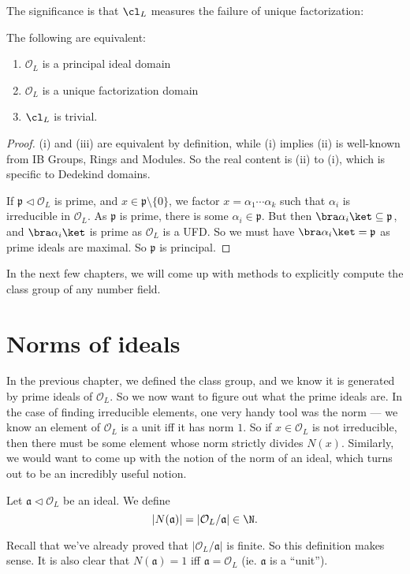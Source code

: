 \documentclass[a4paper]{article}
\begin{document}
The significance is that $\cl_L$ measures the failure of unique factorization:
\begin{thm}
  The following are equivalent:
  \begin{enumerate}
    \item $\mathcal{O}_L$ is a principal ideal domain
    \item $\mathcal{O}_L$ is a unique factorization domain
    \item $\cl_L$ is trivial.
  \end{enumerate}
\end{thm}
\begin{proof}
  (i) and (iii) are equivalent by definition, while (i) implies (ii) is well-known from IB Groups, Rings and Modules. So the real content is (ii) to (i), which is specific to Dedekind domains.

  If $\mathfrak{p} \lhd \mathcal{O}_L$ is prime, and $x \in \mathfrak{p} \setminus \{0\}$, we factor $x = \alpha_1 \cdots \alpha_k$ such that $\alpha_i$ is irreducible in $\mathcal{O}_L$. As $\mathfrak{p}$ is prime, there is some $\alpha_i \in \mathfrak{p}$. But then $\bra \alpha_i\ket \subseteq \mathfrak{p}$, and $\bra \alpha_i\ket$ is prime as $\mathcal{O}_L$ is a UFD. So we must have $\bra \alpha_i\ket = \mathfrak{p}$ as prime ideals are maximal. So $\mathfrak{p}$ is principal.
\end{proof}

In the next few chapters, we will come up with methods to explicitly compute the class group of any number field.

\section{Norms of ideals}
In the previous chapter, we defined the class group, and we know it is generated by prime ideals of $\mathcal{O}_L$. So we now want to figure out what the prime ideals are. In the case of finding irreducible elements, one very handy tool was the norm --- we know an element of $\mathcal{O}_L$ is a unit iff it has norm $1$. So if $x \in \mathcal{O}_L$ is not irreducible, then there must be some element whose norm strictly divides $N(x)$. Similarly, we would want to come up with the notion of the norm of an ideal, which turns out to be an incredibly useful notion.

\begin{defi}
  Let $\mathfrak{a} \lhd \mathcal{O}_L$ be an ideal. We define
  \[
    |N(\mathfrak{a})| = |\mathcal{O}_L/\mathfrak{a}| \in \N.
  \]
\end{defi}
Recall that we've already proved that $|\mathcal{O}_L/\mathfrak{a}|$ is finite. So this definition makes sense. It is also clear that $N(\mathfrak{a}) = 1$ iff $\mathfrak{a} = \mathcal{O}_L$ (ie. $\mathfrak{a}$ is a ``unit'').
\end{document}
